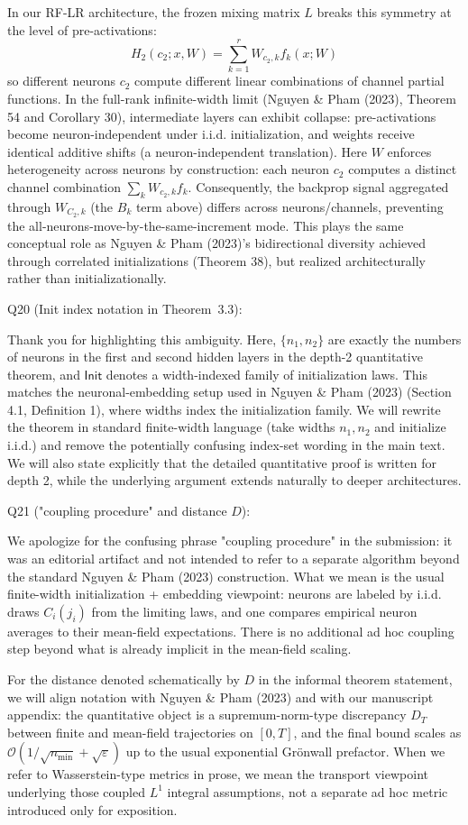 In our RF-LR architecture, the frozen mixing matrix $L$ breaks this symmetry at the level of pre-activations:
$$
H_2(c_2;x,W)=\sum_{k=1}^r W_{c_2,k}f_k(x;W)
$$
so different neurons $c_2$ compute different linear combinations of channel partial functions. In the full-rank infinite-width limit (Nguyen \& Pham (2023), Theorem 54 and Corollary 30), intermediate layers can exhibit collapse: pre-activations become neuron-independent under i.i.d. initialization, and weights receive identical additive shifts (a neuron-independent translation). Here $W$ enforces heterogeneity across neurons by construction: each neuron $c_2$ computes a distinct channel combination $\sum_k W_{c_2,k}f_k$. Consequently, the backprop signal aggregated through $W_{C_2,k}$ (the $B_k$ term above) differs across neurons/channels, preventing the all-neurons-move-by-the-same-increment mode. This plays the same conceptual role as Nguyen \& Pham (2023)'s bidirectional diversity achieved through correlated initializations (Theorem 38), but realized architecturally rather than initializationally.

Q20 (Init index notation in Theorem~3.3):

Thank you for highlighting this ambiguity. Here, $\{n_1,n_2\}$ are exactly the numbers of neurons in the first and second hidden layers in the depth-2 quantitative theorem, and $\mathsf{Init}$ denotes a width-indexed family of initialization laws. This matches the neuronal-embedding setup used in Nguyen \& Pham (2023) (Section 4.1, Definition 1), where widths index the initialization family. We will rewrite the theorem in standard finite-width language (take widths $n_1,n_2$ and initialize i.i.d.) and remove the potentially confusing index-set wording in the main text. We will also state explicitly that the detailed quantitative proof is written for depth 2, while the underlying argument extends naturally to deeper architectures.

Q21 ("coupling procedure" and distance $D$):

We apologize for the confusing phrase "coupling procedure" in the submission: it was an editorial artifact and not intended to refer to a separate algorithm beyond the standard Nguyen \& Pham (2023) construction. What we mean is the usual finite-width initialization + embedding viewpoint: neurons are labeled by i.i.d. draws $C_i(j_i)$ from the limiting laws, and one compares empirical neuron averages to their mean-field expectations. There is no additional ad hoc coupling step beyond what is already implicit in the mean-field scaling.

For the distance denoted schematically by $D$ in the informal theorem statement, we will align notation with Nguyen \& Pham (2023) and with our manuscript appendix: the quantitative object is a supremum-norm-type discrepancy $D_T$ between finite and mean-field trajectories on $[0,T]$, and the final bound scales as $\mathcal O(1/\sqrt{n_{\min}}+\sqrt{\varepsilon})$ up to the usual exponential Gr\"onwall prefactor. When we refer to Wasserstein-type metrics in prose, we mean the transport viewpoint underlying those coupled $L^1$ integral assumptions, not a separate ad hoc metric introduced only for exposition.

